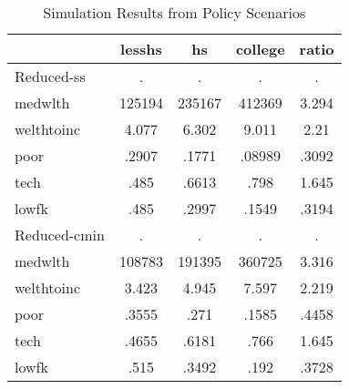 \begin{table}[htbp]
\caption{\label{clabel} Simulation Results from Policy Scenarios}\centering\medskip
\begin{tabular}{lcccc} \hline \hline
 & lesshs  & hs  & college  & ratio  \\  \hline 
Reduced-ss &         . &         . &         . &         . \\  
medwlth &    125194 &    235167 &    412369 &     3.294 \\  
welthtoinc &     4.077 &     6.302 &     9.011 &      2.21 \\  
poor &     .2907 &     .1771 &    .08989 &     .3092 \\  
tech &      .485 &     .6613 &      .798 &     1.645 \\  
lowfk &      .485 &     .2997 &     .1549 &     .3194 \\  
Reduced-cmin &         . &         . &         . &         . \\  
medwlth &    108783 &    191395 &    360725 &     3.316 \\  
welthtoinc &     3.423 &     4.945 &     7.597 &     2.219 \\  
poor &     .3555 &      .271 &     .1585 &     .4458 \\  
tech &     .4655 &     .6181 &      .766 &     1.645 \\  
lowfk &      .515 &     .3492 &      .192 &     .3728 \\  
\hline \hline \end{tabular}
\end{table}
